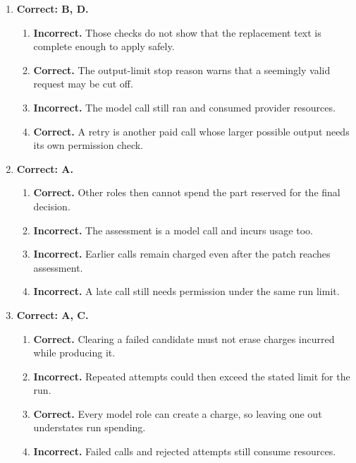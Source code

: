 \begin{enumerate}[start=51,itemsep=0.7\baselineskip]
\item[{\hyperref[exercise:57]{57.}}] \begin{minipage}[t]{\linewidth}
\textbf{Correct: B, D.}
\begin{enumerate}[label=\textnormal{(\Alph*)},leftmargin=*,itemsep=0pt]
\item \textbf{Incorrect.} Those checks do not show that the replacement text is complete enough to apply safely.
\item \textbf{Correct.} The output-limit stop reason warns that a seemingly valid request may be cut off.
\item \textbf{Incorrect.} The model call still ran and consumed provider resources.
\item \textbf{Correct.} A retry is another paid call whose larger possible output needs its own permission check.
\end{enumerate}
\end{minipage}

\item[{\hyperref[exercise:58]{58.}}] \begin{minipage}[t]{\linewidth}
\textbf{Correct: A.}
\begin{enumerate}[label=\textnormal{(\Alph*)},leftmargin=*,itemsep=0pt]
\item \textbf{Correct.} Other roles then cannot spend the part reserved for the final decision.
\item \textbf{Incorrect.} The assessment is a model call and incurs usage too.
\item \textbf{Incorrect.} Earlier calls remain charged even after the patch reaches assessment.
\item \textbf{Incorrect.} A late call still needs permission under the same run limit.
\end{enumerate}
\end{minipage}

\item[{\hyperref[exercise:59]{59.}}] \begin{minipage}[t]{\linewidth}
\textbf{Correct: A, C.}
\begin{enumerate}[label=\textnormal{(\Alph*)},leftmargin=*,itemsep=0pt]
\item \textbf{Correct.} Clearing a failed candidate must not erase charges incurred while producing it.
\item \textbf{Incorrect.} Repeated attempts could then exceed the stated limit for the run.
\item \textbf{Correct.} Every model role can create a charge, so leaving one out understates run spending.
\item \textbf{Incorrect.} Failed calls and rejected attempts still consume resources.
\end{enumerate}
\end{minipage}


\end{enumerate}
